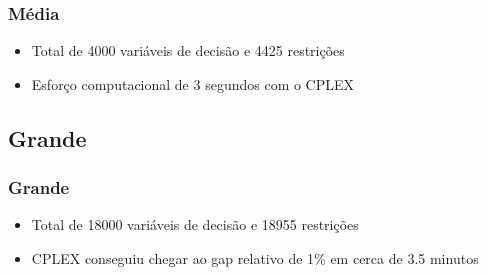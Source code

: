 \documentclass{beamer}
\begin{document}
\begin{frame}
	\frametitle{Média}
	\begin{itemize}
		\item Total de 4000 variáveis de decisão e 4425 restrições
		\item Esforço computacional de 3 segundos com o CPLEX
	\end{itemize}
\end{frame}

%


\subsection{Grande}

\begin{frame}
	\frametitle{Grande}
	\begin{itemize}
		\item Total de 18000 variáveis de decisão e 18955 restrições
		\item CPLEX conseguiu chegar ao gap relativo de 1\% em cerca de 3.5 minutos
	\end{itemize}
\end{frame}

%
\end{document}
